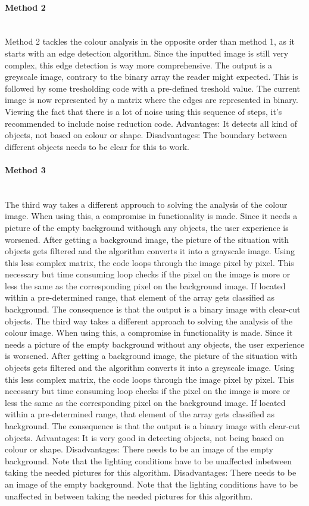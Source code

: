 \documentclass[11pt]{article}
\begin{document}
\paragraph{Method 2}\mbox{}\\
Method 2 tackles the colour analysis in the opposite order than method 1, as it starts with an edge detection algorithm. Since the inputted image is still very complex, this edge detection is way more comprehensive. The output is a greyscale image, contrary to the binary array the reader might expected. This is followed by some tresholding code with a pre-defined treshold value. The current image is now represented by a matrix where the edges are represented in binary. Viewing the fact that there is a lot of noise using this sequence of steps, it's recommended to include noise reduction code. 
Advantages: It detects all kind of objects, not based on colour or shape.
Disadvantages: The boundary between different objects needs to be clear for this to work.
\paragraph{Method 3}\mbox{}\\
The third way takes a different approuch to solving the analysis of the colour image. When using this, a compromise in functionality is made. Since it needs a picture of the empty background withough any objects, the user experience is worsened. After getting a background image, the picture of the situation with objects gets filtered and the algorithm converts it into a grayscale image. Using this less complex matrix, the code loops through the image pixel by pixel. This necessary but time consuming loop checks if the pixel on the image is more or less the same as the corresponding pixel on the background image. If located within a pre-determined range, that element of the array gets classified as background. The consequence is that the output is a binary image with clear-cut objects.
The third way takes a different approach to solving the analysis of the colour image. When using this, a compromise in functionality is made. Since it needs a picture of the empty background without any objects, the user experience is worsened. After getting a background image, the picture of the situation with objects gets filtered and the algorithm converts it into a greyscale image. Using this less complex matrix, the code loops through the image pixel by pixel. This necessary but time consuming loop checks if the pixel on the image is more or less the same as the corresponding pixel on the background image. If located within a pre-determined range, that element of the array gets classified as background. The consequence is that the output is a binary image with clear-cut objects.
Advantages: It is very good in detecting objects, not being based on colour or shape.
Disadvantages: There needs to be an image of the empty background. Note that the lighting conditions have to be unaffected inbetween taking the needed pictures for this algorithm.
Disadvantages: There needs to be an image of the empty background. Note that the lighting conditions have to be unaffected in between taking the needed pictures for this algorithm.
\end{document}
